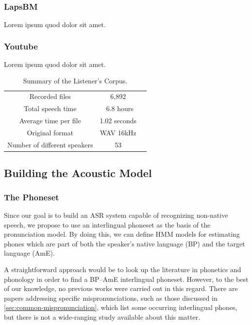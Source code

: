 \subsubsection{LapsBM}
Lorem ipsum quod dolor sit amet.

\subsubsection{Youtube}
Lorem ipsum quod dolor sit amet.

\begin{table}[H]
\caption[Summary of Listener's Corpus.]{Summary of the Listener's Corpus.}
\smallskip
\centering
\begin{tabular}{ccc} \toprule
  Recorded files & 6,892 \\
  Total speech time & ~6.8 hours \\
  Average time per file & 1.02 seconds \\
  Original format & WAV 16kHz \\
  Number of different speakers & 53 \\
  \bottomrule
\end{tabular}
\end{table}


\clearpage
\subsection{Building the Acoustic Model}

\subsubsection{The Phoneset}\label{sec:listener-phoneset}

Since our goal is to build an \ac{ASR} system capable of recognizing non-native speech, we propose
to use an interlingual phoneset as the basis of the pronunciation model. By doing this, we can define
\ac{HMM} models for estimating phones which are part of both the speaker's native language (\ac{BP}) and 
the target language (\ac{AmE}).

A straightforward approach would be to look up the literature in phonetics and phonology in order to find
a \ac{BP}--\ac{AmE} interlingual phoneset. However, to the best of our knowledge, no previous works were carried 
out in this regard. There are papers addressing specific mispronunciations, such as those discussed in \autoref{sec:common-mispronunciation}, 
which list some occurring interlingual phones, but there is not a wide-ranging study available about this matter.

